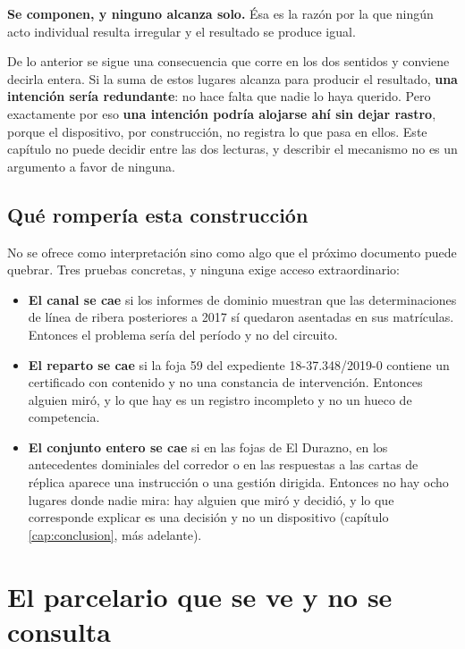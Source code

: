 \textbf{Se componen, y ninguno alcanza solo.} Ésa es la razón por la que ningún acto individual
resulta irregular y el resultado se produce igual.

\begin{cautela}
De lo anterior se sigue una consecuencia que corre en los dos sentidos y conviene decirla
entera. Si la suma de estos lugares alcanza para producir el resultado, \textbf{una intención
sería redundante}: no hace falta que nadie lo haya querido. Pero exactamente por eso
\textbf{una intención podría alojarse ahí sin dejar rastro}, porque el dispositivo, por
construcción, no registra lo que pasa en ellos. Este capítulo no puede decidir entre las dos
lecturas, y describir el mecanismo no es un argumento a favor de ninguna.
\end{cautela}

\subsection*{Qué rompería esta construcción}

No se ofrece como interpretación sino como algo que el próximo documento puede quebrar. Tres
pruebas concretas, y ninguna exige acceso extraordinario:

\begin{itemize}[leftmargin=*,nosep]
\item \textbf{El canal se cae} si los informes de dominio muestran que las determinaciones de
línea de ribera posteriores a 2017 sí quedaron asentadas en sus matrículas. Entonces el
problema sería del período y no del circuito.
\item \textbf{El reparto se cae} si la foja 59 del expediente 18-37.348/2019-0 contiene un
certificado con contenido y no una constancia de intervención. Entonces alguien miró, y lo que
hay es un registro incompleto y no un hueco de competencia.
\item \textbf{El conjunto entero se cae} si en las fojas de El Durazno, en los antecedentes
dominiales del corredor o en las respuestas a las cartas de réplica aparece una instrucción o
una gestión dirigida. Entonces no hay ocho lugares donde nadie mira: hay alguien que miró y
decidió, y lo que corresponde explicar es una decisión y no un dispositivo (capítulo
\ref{cap:conclusion}, más adelante).
\end{itemize}

\section{El parcelario que se ve y no se consulta}

